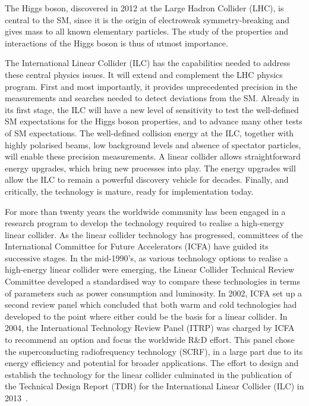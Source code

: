 \documentclass[%
reprint,
 floatfix,
 amsmath,amssymb,
 aps,
]{revtex4-1}
\begin{document}
The Higgs boson,
 discovered in 2012 at the Large Hadron Collider (LHC), is
central to the SM,  since it is the  origin of 
 electroweak symmetry-breaking and gives mass to all 
known elementary particles.   The study of the properties and
interactions of the Higgs boson is thus of utmost importance.

The International Linear Collider (ILC) has the capabilities needed
to address these central physics issues.  It will extend and complement the LHC physics program. First and most importantly, it provides
unprecedented precision in the measurements and searches needed to detect deviations from the SM.
Already in its first stage, the 
ILC will have a new level of sensitivity to test the well-defined SM
expectations for the Higgs boson properties, and to advance many other 
tests of SM expectations.  
The well-defined collision energy at the ILC, together with highly polarised beams, low background levels and absence of spectator particles, will enable these precision measurements.
    A linear collider allows straightforward energy
upgrades, which bring new processes into play. 
The energy upgrades will allow the ILC to remain a powerful 
discovery vehicle for decades. 
Finally, and critically, the technology is mature, 
ready for implementation today.

For more than twenty years the worldwide community has been engaged in
a research program to develop the technology required to realise a
high-energy linear collider.  As the linear collider technology has
progressed,
committees of   the International Committee for Future Accelerators
(ICFA) have  guided its successive stages.
In the mid-1990's, as various technology options to
realise a high-energy linear collider were emerging, the 
Linear Collider Technical Review Committee developed a standardised
way to  compare  these  technologies in terms of parameters such as
power consumption and luminosity. In 2002, ICFA set up a second
review panel which concluded that both warm and cold technologies had
developed to the point where either could be the basis for a linear
collider. In 2004, the  International Technology Review Panel
(ITRP) was charged by ICFA to recommend an option and focus the
worldwide R\&D effort.  This panel chose the  superconducting
radiofrequency technology (SCRF), in a large part due to its
energy efficiency and potential for broader applications. 
The effort to design and
establish the technology for the linear collider culminated in the
publication of the Technical Design Report (TDR) for the International
Linear Collider (ILC) in 2013~\cite{Behnke:2013xla}. 
\end{document}
